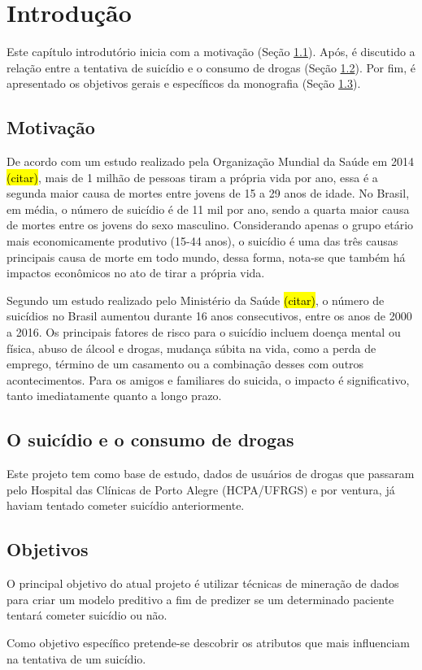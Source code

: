 \chapter{Introdução}
\label{cap:introducao}
Este capítulo introdutório inicia com a motivação (Seção \ref{sec:motivacao}). Após, é discutido a relação entre a tentativa de suicídio e o consumo de drogas (Seção \ref{sec:suicidio_e_drogas}). Por fim, é apresentado os objetivos gerais e específicos da monografia (Seção \ref{sec:objetivos}).

\section{Motivação}
\label{sec:motivacao}
De acordo com um estudo realizado pela Organização Mundial da Saúde em 2014 \hl{(citar)}, mais de 1 milhão de pessoas tiram a própria vida por ano, essa é a segunda maior causa de mortes entre jovens de 15 a 29 anos de idade. No Brasil, em média, o número de suicídio é de 11 mil por ano, sendo a quarta maior causa de mortes entre os jovens do sexo masculino. Considerando apenas o grupo etário mais economicamente produtivo (15-44 anos), o suicídio é uma das três causas principais causa de morte em todo mundo, dessa forma, nota-se que também há impactos econômicos no ato de tirar a própria vida. 

Segundo um estudo realizado pelo Ministério da Saúde \hl{(citar)}, o número de suicídios no Brasil aumentou durante 16 anos consecutivos, entre os anos de 2000 a 2016. Os principais fatores de risco para o suicídio incluem doença mental ou física, abuso de álcool e drogas, mudança súbita na vida, como a perda de emprego, término de um casamento ou a combinação desses com outros acontecimentos. Para os amigos e familiares do suicida, o impacto é significativo, tanto imediatamente quanto a longo prazo. 

\section{O suicídio e o consumo de drogas}
\label{sec:suicidio_e_drogas}


Este projeto tem como base de estudo, dados de usuários de drogas que passaram pelo Hospital das Clínicas de Porto Alegre (HCPA/UFRGS) e por ventura, já haviam tentado cometer suicídio anteriormente.

\section{Objetivos}
\label{sec:objetivos}
O principal objetivo do atual projeto é utilizar técnicas de mineração de dados para criar um modelo preditivo a fim de predizer se um determinado paciente tentará cometer suicídio ou não. 

Como objetivo específico pretende-se descobrir os atributos que mais influenciam na tentativa de um suicídio.


